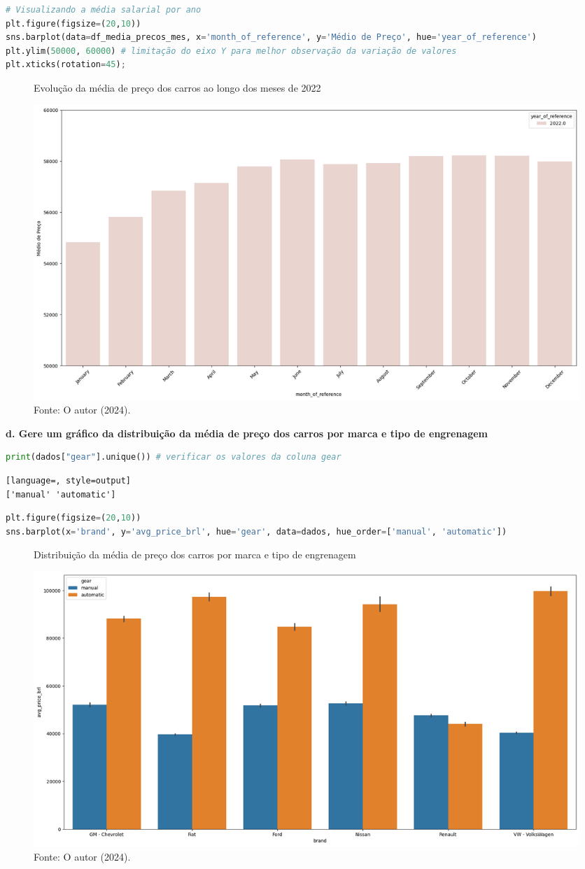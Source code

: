 \begin{lstlisting}[language=Python, style=input]
# Visualizando a média salarial por ano
plt.figure(figsize=(20,10)) 
sns.barplot(data=df_media_precos_mes, x='month_of_reference', y='Médio de Preço', hue='year_of_reference')
plt.ylim(50000, 60000) # limitação do eixo Y para melhor observação da variação de valores
plt.xticks(rotation=45);
\end{lstlisting}
\begin{figure}[H]
\centering
\caption{Evolução da média de preço dos carros ao longo dos meses de 2022}
\includegraphics[width=1\linewidth]{apendices/fig/2_IAA002_3.png}
\caption*{Fonte: O autor (2024).}
\end{figure}



\begin{adjustwidth}{1em}{}
\textbf{d. Gere um gráfico da distribuição da média de preço dos carros por marca e tipo de engrenagem}
\end{adjustwidth}
\begin{lstlisting}[language=Python, style=input]
print(dados["gear"].unique()) # verificar os valores da coluna gear
\end{lstlisting}
\begin{lstlisting}[language=, style=output]
['manual' 'automatic']
\end{lstlisting}
\begin{lstlisting}[language=Python, style=input]
plt.figure(figsize=(20,10))
sns.barplot(x='brand', y='avg_price_brl', hue='gear', data=dados, hue_order=['manual', 'automatic'])
\end{lstlisting}
\begin{figure}[H]
\centering
\caption{Distribuição da média de preço dos carros por marca e tipo de engrenagem}
\includegraphics[width=1\linewidth]{apendices/fig/2_IAA002_4.png}
\caption*{Fonte: O autor (2024).}
\end{figure}


